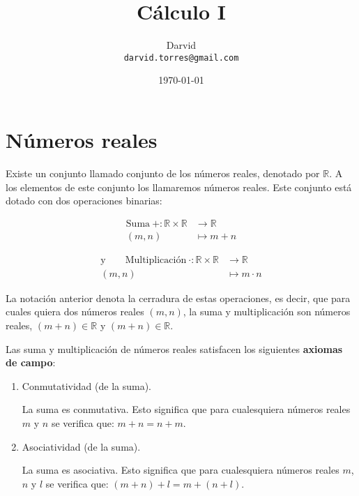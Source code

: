 \documentclass[11pt]{article}
\newcommand{\R}{\mathbb{R}}
\begin{document}
\title{\vspace{-2cm}Cálculo I}
\author{Darvid \\ \texttt{darvid.torres@gmail.com}}
\date{\today}
\maketitle
\thispagestyle{empty}

\section*{Números reales}

Existe un conjunto llamado conjunto de los números reales, denotado por $\R$. A los elementos de este conjunto los llamaremos números reales. Este conjunto está dotado con dos operaciones binarias:\vspace{-0.5cm}
\begin{center}
\noindent\begin{minipage}[r]{5.5cm}
\begin{align*}
    \text{Suma} \ + : \R \times \R &\to \R\\
    (m,n) &\mapsto m+n
\end{align*}
\end{minipage}%
\begin{minipage}[l]{6.5cm}
\begin{align*}
    \text{y} \qquad \text{Multiplicación} \ \cdot : \R \times \R &\to \R\\
    (m,n) &\mapsto m \cdot n
\end{align*}
\end{minipage}
\end{center}

La notación anterior denota la cerradura de estas operaciones, es decir, que para cuales quiera dos números reales $(m,n)$, la suma y multiplicación son números reales, $(m+n)\in \R$ y $(m+n)\in \R$.

Las suma y multiplicación de números reales satisfacen los siguientes \textbf{axiomas de campo}:

\begin{enumerate}[label=S\arabic*.]
    \item Conmutatividad (de la suma).
    
    La suma es conmutativa. Esto significa que para cualesquiera números reales $m$ y $n$ se verifica que: $ m+n = n+m $.
    \item Asociatividad (de la suma).
    
    La suma es asociativa. Esto significa que para cualesquiera números reales $m$, $n$ y $l$ se verifica que: $(m+ n)+l = m+(n+ l)$.
\end{enumerate}
\end{document}
